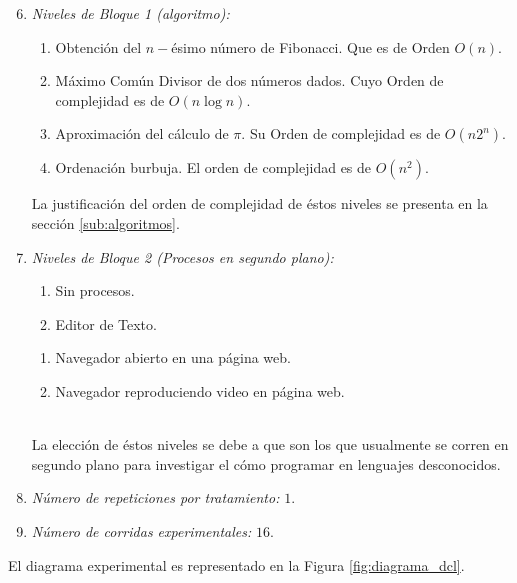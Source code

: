 \documentclass[11pt,a4paper]{article}
\begin{document}
\begin{enumerate}
	\setcounter{enumi}{5}
\item \textit{Niveles de Bloque 1 (algoritmo):}
	\begin{enumerate}
		\item Obtención del \(n-\)ésimo número de Fibonacci. Que es de Orden \(O(n)\).
		\item Máximo Común Divisor de dos números dados. Cuyo Orden de complejidad es de \(O(n \log n)\).
		\item Aproximación del cálculo de \(\pi\). Su Orden de complejidad es de \(O(n2^n)\).
		\item Ordenación burbuja. El orden de complejidad es de \(O(n^2)\).
	\end{enumerate}
		La justificación del orden de complejidad de éstos niveles se presenta en la sección \ref{sub:algoritmos}.
	\item \textit{Niveles de Bloque 2 (Procesos en segundo plano):}\\[2mm]
		\begin{minipage}{0.3\linewidth}
			\begin{enumerate}[noitemsep]
				\item Sin procesos.
				\item Editor de Texto.
			\end{enumerate}
		\end{minipage}\hspace{5mm}
		\begin{minipage}{0.7\linewidth}
			\begin{enumerate}[noitemsep]
				\item Navegador abierto en una página web.
				\item Navegador reproduciendo video en página web.
			\end{enumerate}
		\end{minipage}\\[2mm]
		La elección de éstos niveles se debe a que son los que usualmente se corren en segundo plano para investigar el cómo programar en lenguajes desconocidos.
	\item \textit{Número de repeticiones por tratamiento:} \(1\).
	\item \textit{Número de corridas experimentales:} \(16\).
\end{enumerate}
El diagrama experimental es representado en la Figura \ref{fig:diagrama_dcl}.
\newpage
\end{document}
